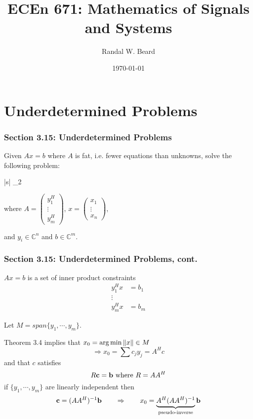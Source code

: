 \documentclass{beamer}
\title{ECEn 671: Mathematics of Signals and Systems}
\author{Randal W. Beard}
\institute{Brigham Young University}
\date{\today}
\begin{document}
\begin{frame}
	\titlepage
\end{frame}



\section{Underdetermined Problems}
\frame{\sectionpage}

\begin{frame}\frametitle{Section 3.15: Underdetermined Problems}
		Given $Ax = b$ where $A$ is fat, i.e. fewer equations than unknowns,
	solve the following problem:
		\begin{mini*}|s|
		{}{_2}{}{}
		\end{mini*}
	where
	$A = \left(
		\begin{array}{c}
		y_1^H\\
		\vdots\\
		y_m^H
		\end{array}
		\right)$, 
	$x = \left(
		\begin{array}{c}
		x_1\\
		\vdots\\
		x_n
		\end{array}
		\right)$, 
	
	and $y_i \in \mathbb{C}^n$ and $b \in \mathbb{C}^m$.

\end{frame}

\begin{frame}\frametitle{Section 3.15: Underdetermined Problems, cont.}
	$Ax = b$ is a set of inner product constraints
	\begin{align*}
	y_1^Hx &= b_1\\
	\vdots\\
	y_m^Hx &= b_m
	\end{align*}
	
	\vfill
	
	Let $M = span\{y_1, \cdots, y_m\}$.
	
	\vfill
	
	Theorem 3.4 implies that $x_0 = \arg\min\left\|x \right\| \in M$
	\[ \Rightarrow x_0 = \sum c_jy_j = A^Hc \]
	and that $c$ satisfies
	\[ R\mathbf{c} = \mathbf{b} \text{ where } R = AA^H \]
	if $\{y_1, \cdots, y_m\}$ are linearly independent then
	\[ \mathbf{c} = (AA^H)^{-1}\mathbf{b} \qquad \Rightarrow \qquad x_0 =
	\underbrace{A^H(AA^H)^{-1}}_{\text{pseudo-inverse}}\mathbf{b} \]	
\end{frame}


	
\end{document}

